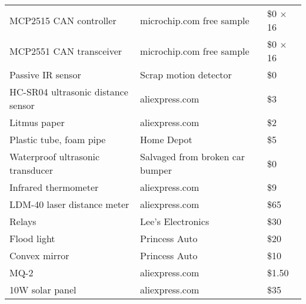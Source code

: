 \begin{longtable}{ |l|l|l| }
  MCP2515 CAN controller & microchip.com free sample & \$0 $\times$ 16 \\
  MCP2551 CAN transceiver & microchip.com free sample & \$0 $\times$ 16 \\
  Passive IR sensor & Scrap motion detector & \$0 \\
  HC-SR04 ultrasonic distance sensor & aliexpress.com & \$3 \\
  Litmus paper & aliexpress.com & \$2 \\
  Plastic tube, foam pipe & Home Depot & \$5 \\
  Waterproof ultrasonic transducer & Salvaged from broken car bumper & \$0 \\
  Infrared thermometer & aliexpress.com & \$9 \\
  LDM-40 laser distance meter & aliexpress.com & \$65 \\  
  Relays & Lee's Electronics & \$30 \\
  Flood light & Princess Auto & \$20 \\
  Convex mirror & Princess Auto & \$10 \\
  MQ-2 & aliexpress.com & \$1.50 \\
  10W solar panel & aliexpress.com & \$35 \\

  
  
\hline
\end{longtable}

